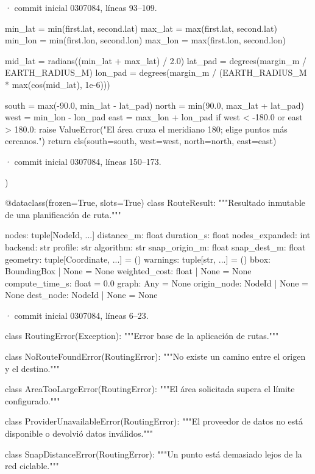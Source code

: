\documentclass[11pt,a4paper]{article}
\begin{document}
\smallskip
{\footnotesize\texttt{} · commit inicial 0307084, líneas 93--109.}\par
\begin{Codigo}[firstnumber=93]

        min_lat = min(first.lat, second.lat)
        max_lat = max(first.lat, second.lat)
        min_lon = min(first.lon, second.lon)
        max_lon = max(first.lon, second.lon)

        mid_lat = radians((min_lat + max_lat) / 2.0)
        lat_pad = degrees(margin_m / EARTH_RADIUS_M)
        lon_pad = degrees(margin_m / (EARTH_RADIUS_M * max(cos(mid_lat), 1e-6)))

        south = max(-90.0, min_lat - lat_pad)
        north = min(90.0, max_lat + lat_pad)
        west = min_lon - lon_pad
        east = max_lon + lon_pad
        if west < -180.0 or east > 180.0:
            raise ValueError("El área cruza el meridiano 180; elige puntos más cercanos.")
        return cls(south=south, west=west, north=north, east=east)
\end{Codigo}

\smallskip
{\footnotesize\texttt{} · commit inicial 0307084, líneas 150--173.}\par
\begin{Codigo}[firstnumber=150]
        )


@dataclass(frozen=True, slots=True)
class RouteResult:
    """Resultado inmutable de una planificación de ruta."""

    nodes: tuple[NodeId, ...]
    distance_m: float
    duration_s: float
    nodes_expanded: int
    backend: str
    profile: str
    algorithm: str
    snap_origin_m: float
    snap_dest_m: float
    geometry: tuple[Coordinate, ...] = ()
    warnings: tuple[str, ...] = ()
    bbox: BoundingBox | None = None
    weighted_cost: float | None = None
    compute_time_s: float = 0.0
    graph: Any = None
    origin_node: NodeId | None = None
    dest_node: NodeId | None = None
\end{Codigo}

\smallskip
{\footnotesize\texttt{} · commit inicial 0307084, líneas 6--23.}\par
\begin{Codigo}[firstnumber=6]
class RoutingError(Exception):
    """Error base de la aplicación de rutas."""


class NoRouteFoundError(RoutingError):
    """No existe un camino entre el origen y el destino."""


class AreaTooLargeError(RoutingError):
    """El área solicitada supera el límite configurado."""


class ProviderUnavailableError(RoutingError):
    """El proveedor de datos no está disponible o devolvió datos inválidos."""


class SnapDistanceError(RoutingError):
    """Un punto está demasiado lejos de la red ciclable."""
\end{Codigo}
\end{document}
